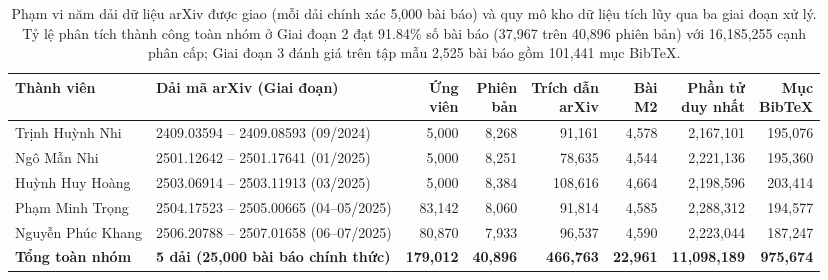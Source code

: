 \begin{table}[htbp]
    \centering
    \scriptsize
    \setlength{\tabcolsep}{3.5pt}
    \renewcommand{\arraystretch}{1.24}
    \begin{tabularx}{\textwidth}{@{}l X r r r r r r@{}}
        \toprule
        \textbf{Thành viên} & \textbf{Dải mã arXiv (Giai đoạn)} &
        \shortstack[r]{\textbf{Ứng}\\\textbf{viên}} &
        \shortstack[r]{\textbf{Phiên}\\\textbf{bản}} &
        \shortstack[r]{\textbf{Trích dẫn}\\\textbf{arXiv}} &
        \shortstack[r]{\textbf{Bài}\\\textbf{M2}} &
        \shortstack[r]{\textbf{Phần tử}\\\textbf{duy nhất}} &
        \shortstack[r]{\textbf{Mục}\\\textbf{BibTeX}} \\
        \midrule
        Trịnh Huỳnh Nhi & 2409.03594 -- 2409.08593 (09/2024) & 5,000 & 8,268 & 91,161 & 4,578 & 2,167,101 & 195,076 \\
        Ngô Mẫn Nhi & 2501.12642 -- 2501.17641 (01/2025) & 5,000 & 8,251 & 78,635 & 4,544 & 2,221,136 & 195,360 \\
        Huỳnh Huy Hoàng & 2503.06914 -- 2503.11913 (03/2025) & 5,000 & 8,384 & 108,616 & 4,664 & 2,198,596 & 203,414 \\
        Phạm Minh Trọng & 2504.17523 -- 2505.00665 (04--05/2025) & 83,142 & 8,060 & 91,814 & 4,585 & 2,288,312 & 194,577 \\
        Nguyễn Phúc Khang & 2506.20788 -- 2507.01658 (06--07/2025) & 80,870 & 7,933 & 96,537 & 4,590 & 2,223,044 & 187,247 \\
        \midrule
        \textbf{Tổng toàn nhóm} & \textbf{5 dải (25,000 bài báo chính thức)} & \textbf{179,012} & \textbf{40,896} & \textbf{466,763} & \textbf{22,961} & \textbf{11,098,189} & \textbf{975,674} \\
        \bottomrule
    \end{tabularx}
    \caption[Phạm vi năm dải dữ liệu arXiv và quy mô tích lũy qua ba giai đoạn]{Phạm vi năm dải dữ liệu arXiv được giao (mỗi dải chính xác 5,000 bài báo) và quy mô kho dữ liệu tích lũy qua ba giai đoạn xử lý. Tỷ lệ phân tích thành công toàn nhóm ở Giai đoạn 2 đạt 91.84\% số bài báo (37,967 trên 40,896 phiên bản) với 16,185,255 cạnh phân cấp; Giai đoạn 3 đánh giá trên tập mẫu 2,525 bài báo gồm 101,441 mục BibTeX.}
    \label{tab:corpus_ranges}
\end{table}

